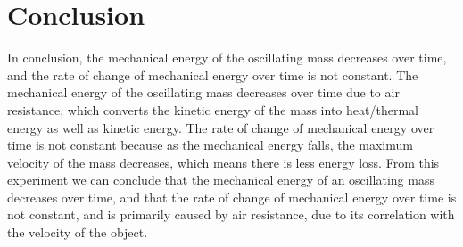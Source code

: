 \documentclass[titlepage]{article}
\begin{document}
    \section{Conclusion}\label{sec:conclusion}
        In conclusion, the mechanical energy of the oscillating mass decreases over time, and the rate of change of mechanical energy over time is not constant.
        The mechanical energy of the oscillating mass decreases over time due to air resistance, which converts the kinetic energy of the mass into heat/thermal energy as well as kinetic energy.
        The rate of change of mechanical energy over time is not constant because as the mechanical energy falls, the maximum velocity of the mass decreases, which means there is less energy loss.
        From this experiment we can conclude that the mechanical energy of an oscillating mass decreases over time, and that the rate of change of mechanical energy over time is not constant, and is primarily caused by air resistance, due to its correlation with the velocity of the object.
   
\end{document}
